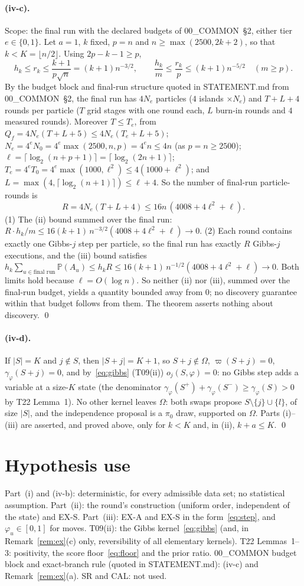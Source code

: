 \documentclass[11pt]{article}
\theoremstyle{definition}
\newcommand{\Om}{\Omega}
\renewcommand{\Pr}{\mathbb P}
\newcommand{\ph}{\varphi}
\newcommand{\vp}{\varpi}
\begin{document}
\paragraph{(iv-c).} Scope: the final run with the declared budgets of 00\_COMMON~\S2, either tier $e\in\{0,1\}$. Let $a=1$, $k$ fixed, $p=n$ and $n\ge\max(2500,2k+2)$, so that $k<K=\lfloor n/2\rfloor$. Using $2p-k-1\ge p$,
\[
h_k\le r_k\le\frac{k+1}{p\sqrt n}=(k+1)n^{-3/2},\qquad \frac{h_k}m\le\frac{r_k}p\le(k+1)n^{-5/2}\quad(m\ge p).
\]
By the budget block and final-run structure quoted in STATEMENT.md from 00\_COMMON~\S2, the final run has $4N_e$ particles ($4$ islands $\times N_e$) and $T+L+4$ rounds per particle ($T$ grid stages with one round each, $L$ burn-in rounds and $4$ measured rounds). Moreover $T\le T_e$, from $Q_f=4N_e(T+L+5)\le4N_e(T_e+L+5)$; $N_e=4^eN_0=4^e\max(2500,n,p)=4^en\le4n$ (as $p=n\ge2500$); $\ell=\lceil\log_2(n+p+1)\rceil=\lceil\log_2(2n+1)\rceil$; $T_e=4^eT_0=4^e\max(1000,\ell^2)\le4(1000+\ell^2)$; and $L=\max(4,\lceil\log_2(n+1)\rceil)\le\ell+4$. So the number of final-run particle-rounds is
\[
R=4N_e(T+L+4)\le16n\,(4008+4\ell^2+\ell).
\]
(1) The (ii) bound summed over the final run: $R\cdot h_k/m\le16(k+1)\,n^{-3/2}(4008+4\ell^2+\ell)\to0$.
(2) Each round contains exactly one Gibbs-$j$ step per particle, so the final run has exactly $R$ Gibbs-$j$ executions, and the (iii) bound satisfies $h_k\sum_{u\in\text{final run}}\Pr(A_u)\le h_kR\le16(k+1)\,n^{-1/2}(4008+4\ell^2+\ell)\to0$.
Both limits hold because $\ell=O(\log n)$. So neither (ii) nor (iii), summed over the final-run budget, yields a quantity bounded away from $0$; no discovery guarantee within that budget follows from them. The theorem asserts nothing about discovery. \qed

\paragraph{(iv-d).} If $|S|=K$ and $j\notin S$, then $|S+j|=K+1$, so $S+j\notin\Om$, $\vp(S+j)=0$, $\gamma_\ph(S+j)=0$, and by~\eqref{eq:gibbs} (T09(ii)) $o_j(S,\ph)=0$: no Gibbs step adds a variable at a size-$K$ state (the denominator $\gamma_\ph(S^+)+\gamma_\ph(S^-)\ge\gamma_\ph(S)>0$ by T22 Lemma~1). No other kernel leaves $\Om$: both swaps propose $S\setminus\{j\}\cup\{l\}$, of size $|S|$, and the independence proposal is a $\pi_0$ draw, supported on $\Om$. Parts (i)--(iii) are asserted, and proved above, only for $k<K$ and, in (ii), $k+a\le K$. \qed

\section*{Hypothesis use}
Part~(i) and (iv-b): deterministic, for every admissible data set; no statistical assumption. Part~(ii): the round's construction (uniform order, independent of the state) and EX-S. Part~(iii): EX-A and EX-S in the form~\eqref{eq:step}, and $\ph_u\in[0,1]$ for moves. T09(ii): the Gibbs kernel~\eqref{eq:gibbs} (and, in Remark~\ref{rem:ex}(c) only, reversibility of all elementary kernels). T22 Lemmas~1--3: positivity, the score floor~\eqref{eq:floor} and the prior ratio. 00\_COMMON budget block and exact-branch rule (quoted in STATEMENT.md): (iv-c) and Remark~\ref{rem:ex}(a). SR and CAL: not used.
\end{document}
